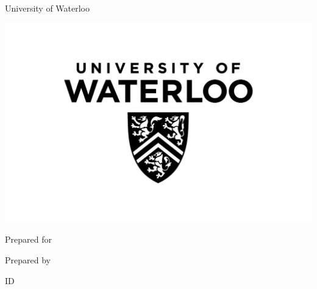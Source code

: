 \begin{titlepage}
  \vspace*{\fill}
  \centering
  {
  {\large{University of Waterloo}

  \large{\department}
  }}
  \bigskip
  \includegraphics[width=0.3\paperwidth]{uwlogo.jpg}

  \bigskip\bigskip
    \textbf{\huge{\reporttitle}}

  \bigskip\bigskip
  \large{Prepared for}

    {
    \yourorganization

    }
    \bigskip\bigskip
  \large{Prepared by}

    {
    \yourname

    ID \youridnumber

    \academicterm\:\yourdiscipline

    }
    \dateofsubmittal{}
    
  \vspace*{\fill}
\end{titlepage}
